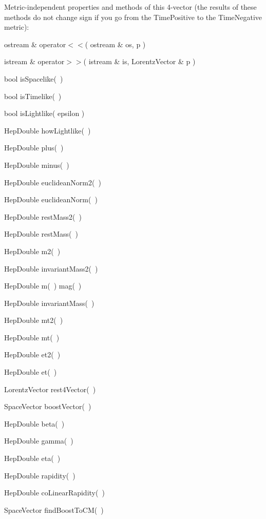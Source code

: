 \noindent
Metric-independent properties and methods of this 4-vector
(the results of these methods do not change sign if you go from the
TimePositive to the TimeNegative metric):
\begin{shortlist}
  \item ostream \& operator$<<$( ostream \& os, p )
  \item istream \& operator$>>$( istream \& is, LorentzVector \& p )
  \item bool isSpacelike(~) \see{\ref{eq:wisSl}}
  \item bool isTimelike(~) \see{\ref{eq:wisTl}}
  \item bool isLightlike( epsilon ) \see{\ref{eq:wisLl}}
  \item HepDouble howLightlike(~) \see{\ref{eq:whowLl}, \ref{eq:whowLl:2}}
  \item HepDouble plus(~)  \see{\ref{eq:wplus}}
  \item HepDouble minus(~) \see{\ref{eq:wminus}}
  \item HepDouble euclideanNorm2(~)  \see{\ref{eq:wENorm2}}
  \item HepDouble euclideanNorm(~)  \see{\ref{eq:wENorm}}
  \item HepDouble restMass2(~) \see{\ref{eq:wrestM2}}
  \item HepDouble restMass(~) \see{\ref{eq:wrestM}}
  \item HepDouble m2(~) \see{\ref{eq:winvMass2}}
  \item HepDouble invariantMass2(~) \see{\ref{eq:winvMass2}}
  \item HepDouble m(~) \/\/\/ mag(~) \see{\ref{eq:wmag}}
  \item HepDouble invariantMass(~) \see{\ref{eq:winvMass}}
  \item HepDouble mt2(~) \see{\ref{eq:wmt2}}
  \item HepDouble mt(~) \see{\ref{eq:wmt}}
  \item HepDouble et2(~) \see{\ref{eq:wet2}}
  \item HepDouble et(~) \see{\ref{eq:wet}}
  \item LorentzVector rest4Vector(~) \see{\ref{eq:wrest4V}}
  \item SpaceVector boostVector(~) \see{\ref{boostvector}}
  \item HepDouble beta(~) \see{\ref{eq:wbeta}}
  \item HepDouble gamma(~) \see{\ref{eq:wgamma}}
  \item HepDouble eta(~) \see{\ref{eq:weta}, \ref{eq:weta:2}, \ref{eq:weta:3}}
  \item HepDouble rapidity(~) \see{\ref{eq:wrapid}, \ref{eq:wrapid:2}}
  \item HepDouble coLinearRapidity(~) \see{\ref{eq:wcoLinRap}, \ref{eq:wcoLinRap:2}}
  \item SpaceVector findBoostToCM(~) \see{\ref{eq:wfindBoost}}
\end{shortlist}

